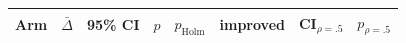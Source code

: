 \begin{tabular}{lrrrrrrr}
\toprule
Arm & $\bar\Delta$ & 95\% CI & $p$ & $p_\text{Holm}$ & improved & CI$_{\rho=.5}$ & $p_{\rho=.5}$ \\
\midrule

\bottomrule
\end{tabular}
